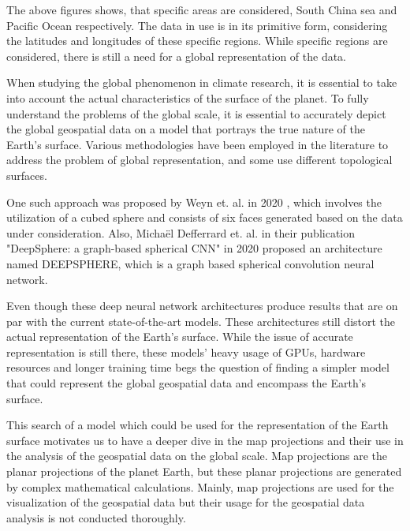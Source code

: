 The above figures shows, that specific areas are considered, South China sea and Pacific Ocean respectively. The data in use is in its primitive form, considering the latitudes and longitudes of these specific regions. While specific regions are considered, there is still a need for a global representation of the data.

When studying the global phenomenon in climate research, it is essential to take into account the actual characteristics of the surface of the planet. To fully understand the problems of the global scale, it is essential to accurately depict the global geospatial data on a model that portrays the true nature of the Earth's surface.
Various methodologies have been employed in the literature to address the problem of global representation, and some use different topological surfaces.

One such approach was proposed by Weyn et. al. in 2020 \cite{Weyn_2020}, which involves the utilization of a cubed sphere and consists of six faces generated based on the data under
consideration. Also, Micha{\"{e}}l Defferrard et. al. in their publication "DeepSphere: a graph-based spherical {CNN}" in 2020 \cite{DBLP:journals/corr/abs-2012-15000} proposed
an architecture named DEEPSPHERE, which is a graph based spherical convolution neural network.

Even though these deep neural network architectures produce results that are on par with the current state-of-the-art models. These architectures still distort the actual
representation of the Earth's surface.
While the issue of accurate representation is still there, these models' heavy usage of GPUs, hardware resources and longer training time begs the question of finding a simpler
model that could represent the global geospatial data and encompass the Earth's surface.

This search of a model which could be used for the representation of the Earth surface motivates us to have a deeper dive in the map projections and their use
in the analysis of the geospatial data on the global scale.
Map projections are the planar projections of the planet Earth, but these planar projections are generated by complex mathematical calculations.
Mainly, map projections are used for the visualization of the geospatial data but their usage for the geospatial data analysis is not conducted thoroughly.


